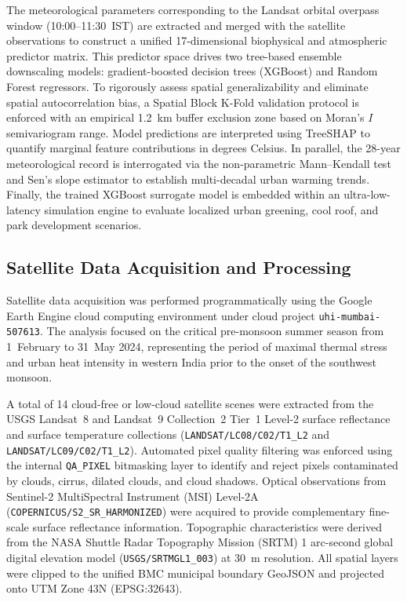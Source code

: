 \documentclass[a4paper,fleqn]{cas-sc}
\begin{document}
The meteorological parameters corresponding to the Landsat orbital overpass window (10:00--11:30~IST) are extracted and merged with the satellite observations to construct a unified 17-dimensional biophysical and atmospheric predictor matrix. This predictor space drives two tree-based ensemble downscaling models: gradient-boosted decision trees (XGBoost) and Random Forest regressors. To rigorously assess spatial generalizability and eliminate spatial autocorrelation bias, a Spatial Block K-Fold validation protocol is enforced with an empirical 1.2~km buffer exclusion zone based on Moran's $I$ semivariogram range. Model predictions are interpreted using TreeSHAP to quantify marginal feature contributions in degrees Celsius. In parallel, the 28-year meteorological record is interrogated via the non-parametric Mann--Kendall test and Sen's slope estimator to establish multi-decadal urban warming trends. Finally, the trained XGBoost surrogate model is embedded within an ultra-low-latency simulation engine to evaluate localized urban greening, cool roof, and park development scenarios.

\subsection{Satellite Data Acquisition and Processing}
\label{subsec:satellite_data}

Satellite data acquisition was performed programmatically using the Google Earth Engine cloud computing environment under cloud project \texttt{uhi-mumbai-507613}. The analysis focused on the critical pre-monsoon summer season from 1~February to 31~May 2024, representing the period of maximal thermal stress and urban heat intensity in western India prior to the onset of the southwest monsoon.

A total of 14 cloud-free or low-cloud satellite scenes were extracted from the USGS Landsat~8 and Landsat~9 Collection~2 Tier~1 Level-2 surface reflectance and surface temperature collections (\texttt{LANDSAT/LC08/C02/T1\_L2} and \texttt{LANDSAT/LC09/C02/T1\_L2}). Automated pixel quality filtering was enforced using the internal \texttt{QA\_PIXEL} bitmasking layer to identify and reject pixels contaminated by clouds, cirrus, dilated clouds, and cloud shadows. Optical observations from Sentinel-2 MultiSpectral Instrument (MSI) Level-2A (\texttt{COPERNICUS/S2\_SR\_HARMONIZED}) were acquired to provide complementary fine-scale surface reflectance information. Topographic characteristics were derived from the NASA Shuttle Radar Topography Mission (SRTM) 1 arc-second global digital elevation model (\texttt{USGS/SRTMGL1\_003}) at 30~m resolution. All spatial layers were clipped to the unified BMC municipal boundary GeoJSON and projected onto UTM Zone 43N (EPSG:32643).
\end{document}
